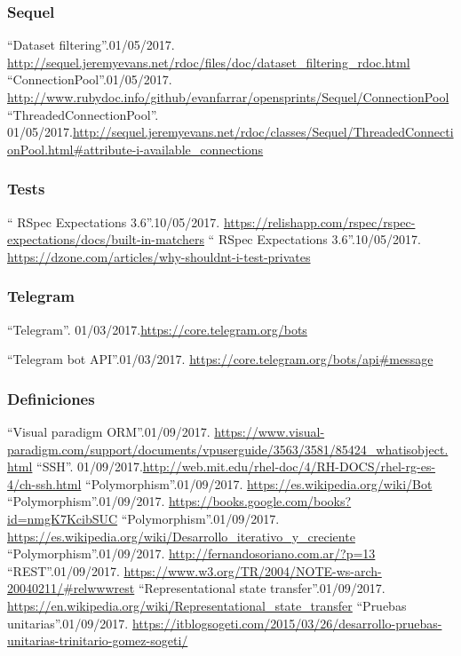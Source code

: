 \documentclass[a4paper,11pt]{book}
\begin{document}
\begin{thebibliography}{99}
\subsubsection*{Sequel}

 ``Dataset filtering''.01/05/2017. \url{http://sequel.jeremyevans.net/rdoc/files/doc/dataset_filtering_rdoc.html}
 ``ConnectionPool''.01/05/2017. \url{http://www.rubydoc.info/github/evanfarrar/opensprints/Sequel/ConnectionPool}
 ``ThreadedConnectionPool''. 01/05/2017.\url{http://sequel.jeremyevans.net/rdoc/classes/Sequel/ThreadedConnectionPool.html#attribute-i-available_connections
}
\subsubsection*{Tests}

 `` RSpec Expectations 3.6''.10/05/2017. \url{https://relishapp.com/rspec/rspec-expectations/docs/built-in-matchers}
 `` RSpec Expectations 3.6''.10/05/2017. \url{https://dzone.com/articles/why-shouldnt-i-test-privates}

\subsubsection*{Telegram}
 ``Telegram''. 01/03/2017.\url{https://core.telegram.org/bots}

 ``Telegram bot API''.01/03/2017. \url{https://core.telegram.org/bots/api#message}

\subsubsection*{Definiciones}
 ``Visual paradigm ORM''.01/09/2017. \url{https://www.visual-paradigm.com/support/documents/vpuserguide/3563/3581/85424_whatisobject.html}
 ``SSH''. 01/09/2017.\url{http://web.mit.edu/rhel-doc/4/RH-DOCS/rhel-rg-es-4/ch-ssh.html}
 ``Polymorphism''.01/09/2017. \url{https://es.wikipedia.org/wiki/Bot}
 ``Polymorphism''.01/09/2017. \url{https://books.google.com/books?id=nmgK7KcibSUC}
 ``Polymorphism''.01/09/2017. \url{https://es.wikipedia.org/wiki/Desarrollo_iterativo_y_creciente}
 ``Polymorphism''.01/09/2017. \url{http://fernandosoriano.com.ar/?p=13}
 ``REST''.01/09/2017. \url{https://www.w3.org/TR/2004/NOTE-ws-arch-20040211/#relwwwrest}
 ``Representational state transfer''.01/09/2017. \url{https://en.wikipedia.org/wiki/Representational_state_transfer}
 ``Pruebas unitarias''.01/09/2017. \url{https://itblogsogeti.com/2015/03/26/desarrollo-pruebas-unitarias-trinitario-gomez-sogeti/
}


\end{thebibliography}
\end{document}
